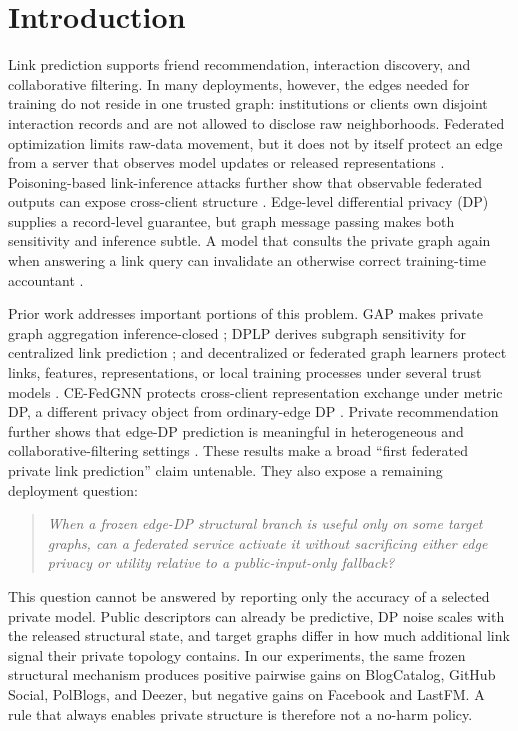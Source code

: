 \section{Introduction}
\label{sec:introduction}

Link prediction supports friend recommendation, interaction discovery, and
collaborative filtering. In many deployments, however, the edges needed for
training do not reside in one trusted graph: institutions or clients own
disjoint interaction records and are not allowed to disclose raw
neighborhoods. Federated optimization limits raw-data movement, but it does
not by itself protect an edge from a server that observes model updates or
released representations \cite{mcmahan2017fedavg,dwork2014algorithmic}.
Poisoning-based link-inference attacks further show that observable federated
outputs can expose cross-client structure \cite{yang2026poisoning}.
Edge-level differential privacy (DP) supplies a record-level guarantee, but
graph message passing makes both sensitivity and inference subtle. A model
that consults the private graph again when answering a link query can invalidate
an otherwise correct training-time accountant \cite{sajadmanesh2023gap}.

Prior work addresses important portions of this problem. GAP makes private
graph aggregation inference-closed \cite{sajadmanesh2023gap}; DPLP derives
subgraph sensitivity for centralized link prediction
\cite{ran2024dplp}; and decentralized or federated graph learners protect
links, features, representations, or local training processes under several
trust models \cite{lin2022solitude,pei2024lga,li2025pdgl,zhang2025privfgl}.
CE-FedGNN protects cross-client representation exchange under metric DP, a
different privacy object from ordinary-edge DP \cite{guo2026cefedgnn}.
Private recommendation further shows that edge-DP prediction is meaningful in
heterogeneous and collaborative-filtering settings
\cite{wang2026pphgrl,hu2025cfdpgnn,li2026fedhgpp}. These results make a broad ``first
federated private link prediction'' claim untenable. They also expose a
remaining deployment question:

\begin{quote}
\emph{When a frozen edge-DP structural branch is useful only on some target
graphs, can a federated service activate it without sacrificing either edge
privacy or utility relative to a public-input-only fallback?}
\end{quote}

This question cannot be answered by reporting only the accuracy of a selected
private model. Public descriptors can already be predictive, DP noise scales
with the released structural state, and target graphs differ in how much
additional link signal their private topology contains. In our experiments,
the same frozen structural mechanism produces positive pairwise gains on
BlogCatalog, GitHub Social, PolBlogs, and Deezer, but negative gains on
Facebook and LastFM. A rule that always enables private structure is therefore
not a no-harm policy.

